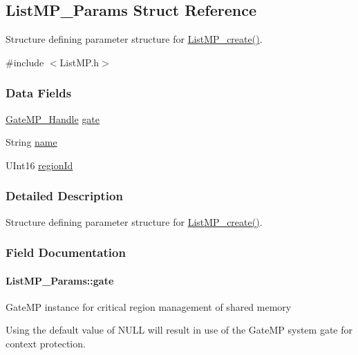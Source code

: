 \subsection{List\-M\-P\-\_\-\-Params Struct Reference}
\label{struct_list_m_p___params}


Structure defining parameter structure for \hyperlink{_list_m_p_8h_a71fdd7f30d377065fb70dd095a186d3e}{List\-M\-P\-\_\-create()}.  




{\ttfamily \#include $<$List\-M\-P.\-h$>$}

\subsubsection*{Data Fields}
\begin{DoxyCompactItemize}
\item 
\hyperlink{_gate_m_p_8h_ad5bb259f928a14e98d973334bc60ebb3}{Gate\-M\-P\-\_\-\-Handle} \hyperlink{struct_list_m_p___params_a4808f5c75029b059fa388a33e158c2f4}{gate}
\item 
String \hyperlink{struct_list_m_p___params_a4ac70f37c8b5584fa115d6d7f412daba}{name}
\item 
U\-Int16 \hyperlink{struct_list_m_p___params_af812a3b0ea4698b841bfbf83eada903a}{region\-Id}
\end{DoxyCompactItemize}


\subsubsection{Detailed Description}
Structure defining parameter structure for \hyperlink{_list_m_p_8h_a71fdd7f30d377065fb70dd095a186d3e}{List\-M\-P\-\_\-create()}. 

\subsubsection{Field Documentation}
\paragraph[{gate}]{ List\-M\-P\-\_\-\-Params\-::gate}\label{struct_list_m_p___params_a4808f5c75029b059fa388a33e158c2f4}
Gate\-M\-P instance for critical region management of shared memory \begin{DoxyVerb}   Using the default value of NULL will result in use of the GateMP
   system gate for context protection.\end{DoxyVerb}
